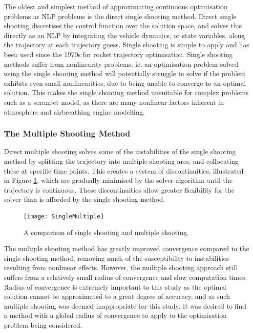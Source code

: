 The oldest and simplest method of approximating continuous optimisation problems as NLP problems is the direct single shooting method. Direct single shooting discretises the control function over the solution space, and solves this directly as an NLP by integrating the vehicle dynamics, or state variables, along the trajectory at each trajectory guess\cite{Betts1998,Kelly2015,Rao2009,Fasano2013}. Single shooting is simple to apply and has been used since the 1970s for rocket trajectory optimisation\cite{jezewski1971}. Single shooting methods suffer from nonlinearity problems, ie. an optimisation problem solved using the single shooting method will potentially struggle to solve if the problem exhibits even small nonlinearities, due to being unable to converge to an optimal solution. This makes the single shooting method unsuitable for complex problems such as a scramjet model, as there are many nonlinear factors inherent in atmosphere and airbreathing engine modelling.

 
\subsubsection{The Multiple Shooting Method}

Direct multiple shooting solves some of the instabilities of the single shooting method by splitting the trajectory into multiple shooting arcs, and collocating these at specific time points\cite{Betts1998,Kelly2015,Rao2009,Fasano2013}. This creates a system of discontinuities, illustrated in Figure \ref{fig:multipleshooting}, which are gradually minimised by the solver algorithm until the trajectory is continuous. These discontinuities allow greater flexibility for the solver than is afforded by the single shooting method. 

\begin{figure}[ht]
	\centering
	\texttt{[image: SingleMultiple]}
	\caption{A comparison of single shooting and multiple shooting\cite{Kelly2015}.}
	\label{fig:multipleshooting}
\end{figure}

The multiple shooting method has greatly improved convergence compared to the single shooting method, removing much of the susceptibility to instabilities resulting from nonlinear effects. However, the multiple shooting approach still suffers from a relatively small radius of convergence and slow computation times. Radius of convergence is extremely important to this study as the optimal solution cannot be approximated to a great degree of accuracy, and as such multiple shooting was deemed inappropriate for this study. It was desired to find a method with a global radius of convergence to apply to the optimisation problem being considered.

